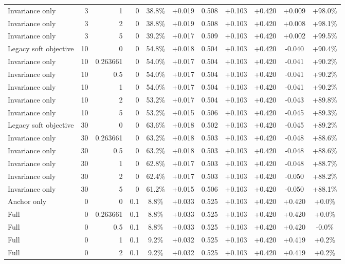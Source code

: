 \begin{table}[htbp]
\begin{tabular}{lrrrccccccc}
Invariance only & 3 & 1 & 0 & 38.8\% & +0.019 & 0.508 & +0.103 & +0.420 & +0.009 & +98.0\% \\
Invariance only & 3 & 2 & 0 & 38.8\% & +0.019 & 0.508 & +0.103 & +0.420 & +0.008 & +98.1\% \\
Invariance only & 3 & 5 & 0 & 39.2\% & +0.017 & 0.509 & +0.103 & +0.420 & +0.002 & +99.5\% \\
Legacy soft objective & 10 & 0 & 0 & 54.8\% & +0.018 & 0.504 & +0.103 & +0.420 & -0.040 & +90.4\% \\
Invariance only & 10 & 0.263661 & 0 & 54.0\% & +0.017 & 0.504 & +0.103 & +0.420 & -0.041 & +90.2\% \\
Invariance only & 10 & 0.5 & 0 & 54.0\% & +0.017 & 0.504 & +0.103 & +0.420 & -0.041 & +90.2\% \\
Invariance only & 10 & 1 & 0 & 54.0\% & +0.017 & 0.504 & +0.103 & +0.420 & -0.041 & +90.2\% \\
Invariance only & 10 & 2 & 0 & 53.2\% & +0.017 & 0.504 & +0.103 & +0.420 & -0.043 & +89.8\% \\
Invariance only & 10 & 5 & 0 & 53.2\% & +0.015 & 0.506 & +0.103 & +0.420 & -0.045 & +89.3\% \\
Legacy soft objective & 30 & 0 & 0 & 63.6\% & +0.018 & 0.502 & +0.103 & +0.420 & -0.045 & +89.2\% \\
Invariance only & 30 & 0.263661 & 0 & 63.2\% & +0.018 & 0.503 & +0.103 & +0.420 & -0.048 & +88.6\% \\
Invariance only & 30 & 0.5 & 0 & 63.2\% & +0.018 & 0.503 & +0.103 & +0.420 & -0.048 & +88.6\% \\
Invariance only & 30 & 1 & 0 & 62.8\% & +0.017 & 0.503 & +0.103 & +0.420 & -0.048 & +88.7\% \\
Invariance only & 30 & 2 & 0 & 62.4\% & +0.017 & 0.503 & +0.103 & +0.420 & -0.050 & +88.2\% \\
Invariance only & 30 & 5 & 0 & 61.2\% & +0.015 & 0.506 & +0.103 & +0.420 & -0.050 & +88.1\% \\
Anchor only & 0 & 0 & 0.1 & 8.8\% & +0.033 & 0.525 & +0.103 & +0.420 & +0.420 & +0.0\% \\
Full & 0 & 0.263661 & 0.1 & 8.8\% & +0.033 & 0.525 & +0.103 & +0.420 & +0.420 & +0.0\% \\
Full & 0 & 0.5 & 0.1 & 8.8\% & +0.033 & 0.525 & +0.103 & +0.420 & +0.420 & -0.0\% \\
Full & 0 & 1 & 0.1 & 9.2\% & +0.032 & 0.525 & +0.103 & +0.420 & +0.419 & +0.2\% \\
Full & 0 & 2 & 0.1 & 9.2\% & +0.032 & 0.525 & +0.103 & +0.420 & +0.419 & +0.2\% \\

\end{tabular}
\end{table}
